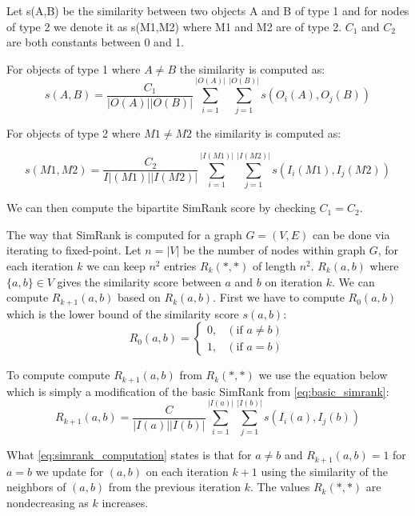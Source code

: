 \begin{definition}\label{def:bipartite_simrank} Let s(A,B) be the similarity between two objects A and B of type 1 and for nodes of type 2 we denote it as s(M1,M2) where M1 and M2 are of type 2. $C_1$ and $C_2$ are both constants between 0 and 1.

	For objects of type 1 where $A \neq B$ the similarity is computed as:
	\begin{equation}\label{eq:bipartite_simrank1}
	s(A,B)= \frac{C_1}{|O(A)||O(B)|}\sum^{|O(A)|}_{i=1}\sum^{|O(B)|}_{j=1}s(O_i(A),O_j(B))
	\end{equation}

	For objects of type 2 where $M1 \neq M2$ the similarity is computed as:

	\begin{equation}\label{eq:bipartite_simrank2}
	s(M1, M2)= \frac{C_2}{I|(M1)||I(M2)|}\sum^{|I(M1)|}_{i=1}\sum^{|I(M2)|}_{j=1}s(I_i(M1),I_j(M2))
	\end{equation}

	We can then compute the bipartite SimRank score by checking $C_1 = C_2$\cite{10.1145/775047.775126}.
\end{definition}

The way that SimRank is computed for a graph $G = (V,E)$ can be done via iterating to fixed-point. Let $n = |V|$ be the number of nodes within graph $G$, for each iteration $k$ we can keep $n^2$ entries $R_k(*,*)$ of length $n^2$. $R_k(a,b)$ where $\{a,b\} \in V$ gives the similarity score between $a$ and $b$ on iteration $k$\cite{10.1145/775047.775126}. We can compute $R_{k+1}(a,b)$ based on $R_k(a,b)$. First we have to compute $R_0(a,b)$ which is the lower bound of the similarity score $s(a,b)$:
\begin{equation}\label{eq:lowerbound_sim_score}
R_0(a,b)= \begin{cases}
0, & (\text{if } a \neq b) \\

1 ,& (\text{if } a = b)
\end{cases}
\end{equation}

To compute compute $R_{k+1}(a,b)$ from $R_k(*,*)$ we use the equation below which is simply a modification of the basic SimRank from \autoref{eq:basic_simrank}:
\begin{equation}\label{eq:simrank_computation}
R_{k+1}(a,b)= \frac{C}{|I(a)||I(b)|}\sum^{|I(a)|}_{i=1}\sum^{|I(b)|}_{j=1}s(I_i(a),I_j(b))
\end{equation}

What \autoref{eq:simrank_computation} states is that for $a \neq b$ and $R_{k+1}(a,b) = 1$ for $a = b$ we update for $(a,b)$ on each iteration $k+1$ using the similarity of the neighbors of $(a,b)$ from the previous iteration $k$. The values $R_k(*,*)$ are nondecreasing as $k$ increases.

